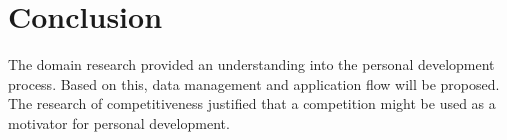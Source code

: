 
\section{Conclusion}\label{sec:domain-conclusion}

The domain research provided an understanding into the personal development process.
Based on this, data management and application flow will be proposed.
The research of competitiveness justified that a competition might be used as a motivator for personal development.
